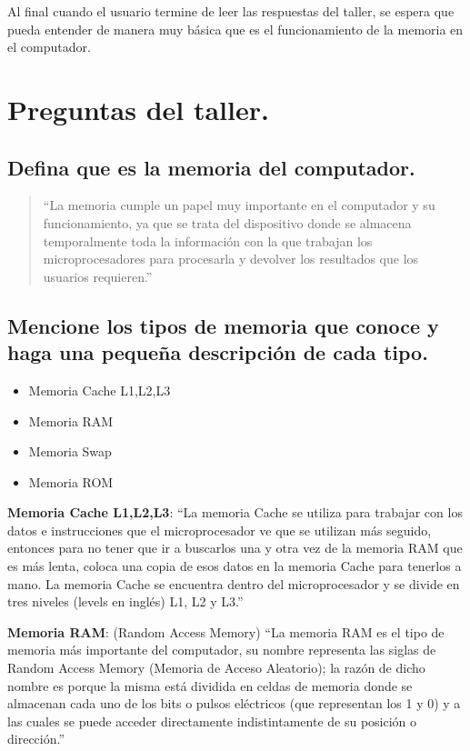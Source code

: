\documentclass[12pt,letterpaper]{article}
\begin{document}
Al final cuando el usuario termine de leer las respuestas del taller, se espera que pueda entender de manera muy básica que es el funcionamiento de la memoria en el computador.\\


\newpage


\section{Preguntas del taller.}\label{preguntas}
    \subsection{Defina que es la memoria del computador.}
        \begin{quote}
            ``La memoria cumple un papel muy importante en el computador y su funcionamiento, ya que se
            trata del dispositivo donde se almacena temporalmente toda la información con la que trabajan
            los microprocesadores para procesarla y devolver los resultados que los usuarios requieren.''\cite{GuiaProfesor}
        \end{quote}

    \subsection{Mencione los tipos de memoria que conoce y haga una pequeña descripción de cada tipo.}
        \begin{itemize}
         \item Memoria Cache L1,L2,L3
         \item Memoria RAM
         \item Memoria Swap
         \item Memoria ROM
        \end{itemize}

        \textbf{Memoria Cache L1,L2,L3}: ``La memoria Cache se utiliza para trabajar con los datos e instrucciones que el microprocesador ve que se utilizan más seguido, entonces para no tener que ir a buscarlos una y otra vez de la memoria RAM que es más lenta, coloca una copia de esos datos en la memoria Cache para tenerlos a mano. La memoria Cache se encuentra dentro del microprocesador y se divide en tres niveles (levels en inglés) L1, L2 y L3.''\cite{GuiaProfesor} 

        \textbf{Memoria RAM}: (Random Access Memory) ``La memoria RAM es el tipo de memoria más importante del computador, su nombre representa las siglas de Random Access Memory (Memoria de Acceso Aleatorio); la razón de dicho nombre es porque la misma está dividida en celdas de memoria donde se almacenan cada uno de los bits o pulsos eléctricos (que representan los 1 y 0) y a las cuales se puede acceder directamente
        indistintamente de su posición o dirección.''\cite{GuiaProfesor}
\end{document}
